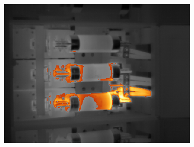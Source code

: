 \documentclass[12pt,twoside,a4paper,titlepage]{report}
\begin{document}
\begin{figure}[ht]
 \centering
 \includegraphics[width=10cm, keepaspectratio=true width=10cm]{img/FLIR_P60_hl_ls}

\end{figure}
\end{document}
